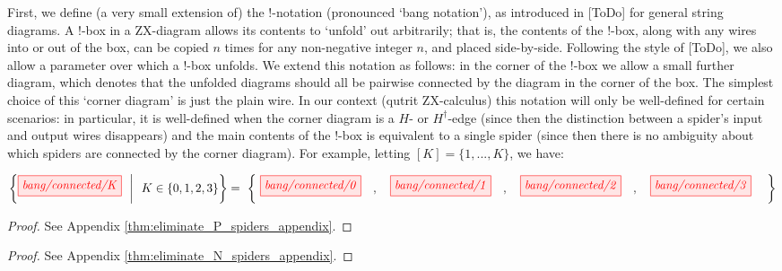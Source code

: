 First, we define (a very small extension of) the !-notation (pronounced `bang notation'), as introduced in [ToDo] for general string diagrams. A !-box in a ZX-diagram allows its contents to `unfold' out arbitrarily; that is, the contents of the !-box, along with any wires into or out of the box, can be copied $n$ times for any non-negative integer $n$, and placed side-by-side. Following the style of [ToDo], we also allow a parameter over which a !-box unfolds. We extend this notation as follows: in the corner of the !-box we allow a small further diagram, which denotes that the unfolded diagrams should all be pairwise connected by the diagram in the corner of the box. The simplest choice of this `corner diagram' is just the plain wire. In our context (qutrit ZX-calculus) this notation will only be well-defined for certain scenarios: in particular, it is well-defined when the corner diagram is a $H$- or $H^{\dagger}$-edge (since then the distinction between a spider's input and output wires disappears) and the main contents of the !-box is equivalent to a single spider (since then there is no ambiguity about which spiders are connected by the corner diagram). For example, letting $[K] = \{1, ..., K\}$, we have: 

\begin{equation*}
	\left\{ \tikzfig{bang/connected/K} ~~ \middle| ~~ K \in \{0, 1, 2, 3\} \right\} = \ 
	\left\{ ~
		\tikzfig{bang/connected/0} \quad , \quad
		\tikzfig{bang/connected/1} \quad , \quad
		\tikzfig{bang/connected/2} \quad , \quad
		\tikzfig{bang/connected/3} \quad
	~ \right\}
\end{equation*}

\begin{theorem}\label{thm:eliminate_P_spiders}
	\eliminatePSpidersStatement
	\begin{proof}
		See Appendix \ref{thm:eliminate_P_spiders_appendix}.
	\end{proof}
\end{theorem}

\begin{theorem}\label{thm:eliminate_N_spiders}
	\eliminateNSpidersStatement
	\begin{proof}
		See Appendix \ref{thm:eliminate_N_spiders_appendix}.
	\end{proof}
\end{theorem}

